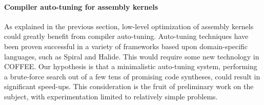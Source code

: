 \paragraph{Compiler auto-tuning for assembly kernels}
As explained in the previous section, low-level optimization of assembly kernels could greatly benefit from compiler auto-tuning. Auto-tuning techniques have been proven successful in a variety of frameworks based upon domain-specific languages, such as Spiral and Halide. This would require some new technology in COFFEE. Our hypothesis is that a minimalistic auto-tuning system, performing a brute-force search out of a few tens of promising code syntheses, could result in significant speed-ups. This consideration is the fruit of preliminary work on the subject, with experimentation limited to relatively simple problems.

